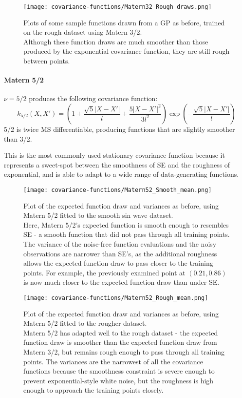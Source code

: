 \begin{figure}[H]
    \texttt{[image: covariance-functions/Matern32\_Rough\_draws.png]}
    \caption{
        Plots of some sample functions drawn from a GP as before, trained on the rough dataset using Matern 3/2. \\
        Although these function draws are much smoother than those produced by the exponential covariance function, they are still rough between points.    }
\end{figure}


\paragraph{Matern 5/2}
$\nu = 5/2$ produces the following covariance function:
\begin{equation*}
    k_{5/2}(X,X') = \left(1 + \frac{\sqrt{5}|X - X'|}{l} + \frac{5|X - X'|^2}{3l^2} \right) \exp \left(-\frac{\sqrt{5}|X - X'|}{l} \right)
\end{equation*}
5/2 is twice MS differentiable, producing functions that are slightly smoother than 3/2. 

This is the most commonly used stationary covariance function \cite{gaupro} because it represents a sweet-spot between the smoothness of SE and the roughness of exponential, and is able to adapt to a wide range of data-generating functions.

\begin{figure}[H]
    \texttt{[image: covariance-functions/Matern52\_Smooth\_mean.png]}
    \caption{
        Plot of the expected function draw and variances as before, using Matern 5/2 fitted to the smooth sin wave dataset. \\
        Here, Matern 5/2's expected function is smooth enough to resembles SE - a smooth function that did not pass through all training points. The variance of the noise-free function evaluations and the noisy observations are narrower than SE's, as the additional roughness allows the expected function draw to pass closer to the training points. For example, the previously examined point at $(0.21, 0.86)$ is now much closer to the expected function draw than under SE.
    }
\end{figure}

\begin{figure}[H]
    \texttt{[image: covariance-functions/Matern52\_Rough\_mean.png]}
    \caption{
        Plot of the expected function draw and variances as before, using Matern 5/2 fitted to the rougher dataset. \\
        Matern 5/2 has adapted well to the rough dataset - the expected function draw is smoother than the expected function draw from Matern 3/2, but remains rough enough to pass through all training points. The variances are the narrowest of all the covariance functions because the smoothness constraint is severe enough to prevent exponential-style white noise, but the roughness is high enough to approach the training points closely. 
    }
\end{figure}

